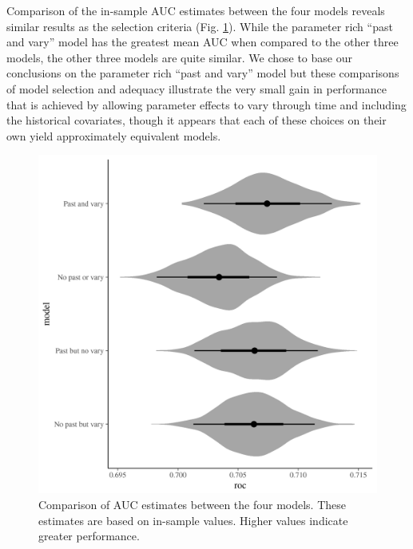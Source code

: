 \documentclass[12pt,letterpaper]{article}
\begin{document}
Comparison of the in-sample AUC estimates between the four models reveals similar results as the selection criteria (Fig. \ref{fig:roc_hist}). While the parameter rich ``past and vary'' model has the greatest mean AUC when compared to the other three models, the other three models are quite similar. We chose to base our conclusions on the parameter rich ``past and vary'' model but these comparisons of model selection and adequacy illustrate the very small gain in performance that is achieved by allowing parameter effects to vary through time and including the historical covariates, though it appears that each of these choices on their own yield approximately equivalent models.
\begin{figure}[ht]
  \centering
  \includegraphics[width=\textwidth,height=0.5\textheight,keepaspectratio=true]{figure/roc_hist}
  \caption{Comparison of AUC estimates between the four models. These estimates are based on in-sample values. Higher values indicate greater performance.}
  \label{fig:roc_hist}
\end{figure}
\end{document}
